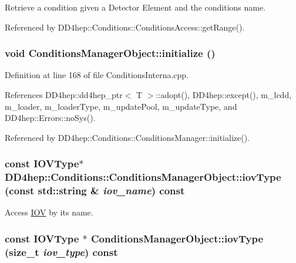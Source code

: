 Retrieve a condition given a Detector Element and the conditions name. 

Referenced by DD4hep::Conditions::ConditionsAccess::getRange().\hypertarget{class_d_d4hep_1_1_conditions_1_1_conditions_manager_object_a598756c7672c67065f3d116689f95722}{
\subsubsection[{initialize}]{\setlength{\rightskip}{0pt plus 5cm}void ConditionsManagerObject::initialize ()}}
\label{class_d_d4hep_1_1_conditions_1_1_conditions_manager_object_a598756c7672c67065f3d116689f95722}


Definition at line 168 of file ConditionsInterna.cpp.

References DD4hep::dd4hep\_\-ptr$<$ T $>$::adopt(), DD4hep::except(), m\_\-lcdd, m\_\-loader, m\_\-loaderType, m\_\-updatePool, m\_\-updateType, and DD4hep::Errors::noSys().

Referenced by DD4hep::Conditions::ConditionsManager::initialize().\hypertarget{class_d_d4hep_1_1_conditions_1_1_conditions_manager_object_a3b5688694720507165694439db5294b8}{
\subsubsection[{iovType}]{\setlength{\rightskip}{0pt plus 5cm}const {\bf IOVType}$\ast$ DD4hep::Conditions::ConditionsManagerObject::iovType (const std::string \& {\em iov\_\-name}) const}}
\label{class_d_d4hep_1_1_conditions_1_1_conditions_manager_object_a3b5688694720507165694439db5294b8}


Access \hyperlink{class_d_d4hep_1_1_i_o_v}{IOV} by its name. \hypertarget{class_d_d4hep_1_1_conditions_1_1_conditions_manager_object_a58a9d92f553861ae2d5fcf036a9b3d77}{
\subsubsection[{iovType}]{\setlength{\rightskip}{0pt plus 5cm}const {\bf IOVType} $\ast$ ConditionsManagerObject::iovType (size\_\-t {\em iov\_\-type}) const}}
\label{class_d_d4hep_1_1_conditions_1_1_conditions_manager_object_a58a9d92f553861ae2d5fcf036a9b3d77}


